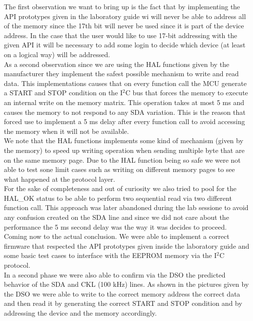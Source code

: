 \documentclass[../main.tex]{subfiles}
\begin{document}
The first observation we want to bring up is the fact that by implementing the API prototypes given in the laboratory guide wi will never be able to address all of the memory since the 17th bit will never be used since it is part of the device address. In the case that the user would like to use 17-bit addressing with the given API it will be necessary to add some login to decide which device (at least on a logical way) will be addressed.\\

As a second observation since we are using the HAL functions given by the manufacturer they implement the safest possible mechanism to write and read data. This implementations causes that on every function call the MCU generate a START and STOP condition on the I$^2$C bus that forces the memory to execute an internal write on the memory matrix. This operation takes at most 5 ms and causes the memory to not respond to any SDA variation. This is the reason that forced use to implement a 5 ms delay after every function call to avoid accessing the memory when it will not be available. \\

We note that the HAL functions implements some kind of mechanism (given by the memory) to speed up writing operation when sending multiple byte that are on the same memory page. Due to the HAL function being so safe we were not able to test sone limit cases such as writing on different memory pages to see what happened at the protocol layer.\\

For the sake of completeness and out of curiosity we also tried to pool for the HAL\_OK status to be able to perform two sequential read via two different function call. This approach was later abandoned during the lab sessione to avoid any confusion created on the SDA line and since we did not care about the performance the 5 ms second delay was the way it was decides to proceed.\\

Coming now to the actual conclusion. We were able to implement a correct firmware that respected the API prototypes given inside the laboratory guide and some basic test cases to interface with the EEPROM memory via the I$^2$C protocol.\\

In a second phase we were also able to confirm via the DSO the predicted behavior of the SDA and CKL (100 kHz) lines.
As shown in the pictures given by the DSO we were able to write to the correct memory address the correct data and then read it by generating the correct START and STOP condition and by addressing the device and the memory accordingly.\\
\end{document}

